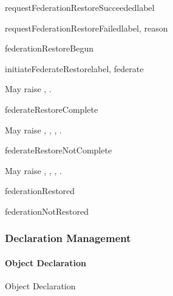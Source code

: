 \begin{methoddesc}{requestFederationRestoreSucceeded}{label}
\end{methoddesc}

\begin{methoddesc}{requestFederationRestoreFailed}{label, reason}
\end{methoddesc}

\begin{methoddesc}{federationRestoreBegun}{}
\end{methoddesc}

\begin{methoddesc}{initiateFederateRestore}{label, federate}

May raise
,
.
\end{methoddesc}

\begin{methoddesc}{federateRestoreComplete}{}

May raise
,
,
,
.
\end{methoddesc}

\begin{methoddesc}{federateRestoreNotComplete}{}

May raise
,
,
,
.
\end{methoddesc}

\begin{methoddesc}{federationRestored}{}
\end{methoddesc}

\begin{methoddesc}{federationNotRestored}{}
\end{methoddesc}

\subsubsection{Declaration Management}

\paragraph{Object Declaration}

\begin{hlamsc}{Object Declaration}

\nextlevel
{}
\nextlevel
{}
\nextlevel
{}
\nextlevel
{}
\nextlevel
{}
\nextlevel[3]
\nextlevel
{}
\nextlevel
{}
\nextlevel
\end{hlamsc}

